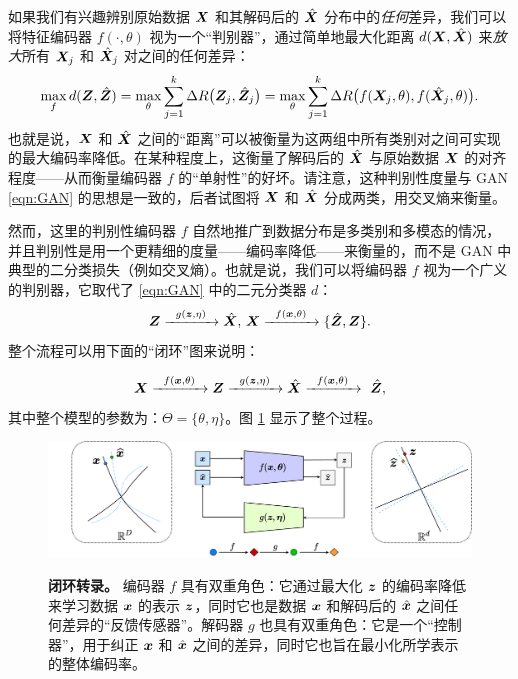 \documentclass[../../book-main.tex]{subfiles}
\begin{document}
{如果我们有兴趣辨别原始数据 $\bm{X}$ 和其解码后的 $\hat {\bm{X}}$ 分布中的{\em 任何}差异，我们可以将特征编码器 $f(\cdot, \theta)$ 视为一个“判别器”，通过简单地最大化距离 $d(\bm{X}, \hat {\bm{X}})$ 来{\em 放大}所有 $\bm{X}_j$ 和 $\hat {\bm{X}}_j$ 对之间的任何差异：
\begin{equation}
\max_f d(\bm{Z}, \hat {\bm{Z}}) = \max_{\theta} \sum_{j=1}^k \Delta R\big(\bm{Z}_j, \hat{\bm{Z}}_j\big) = \max_{\theta} \sum_{j=1}^k \Delta R\big(f(\bm{X}_j,\theta), f(\hat{\bm{X}}_j,\theta)\big).
    \label{eqn:max-distance}
\end{equation}
也就是说，$\bm{X}$ 和 $\hat {\bm{X}}$ 之间的“距离”可以被衡量为这两组中所有类别对之间可实现的最大编码率降低。在某种程度上，这衡量了解码后的 $\hat {\bm{X}}$ 与原始数据 $\bm{X}$ 的对齐程度——从而衡量编码器 $f$ 的“单射性”的好坏。请注意，这种判别性度量与 GAN \eqref{eqn:GAN} 的思想是一致的，后者试图将 $\bm{X}$ 和 $\hat {\bm{X}}$ 分成两类，用交叉熵来衡量。

然而，这里的判别性编码器 $f$ 自然地推广到数据分布是多类别和多模态的情况，并且判别性是用一个更精细的度量——编码率降低——来衡量的，而不是 GAN 中典型的二分类损失（例如交叉熵）。也就是说，我们可以将编码器 $f$ 视为一个广义的判别器，它取代了 \eqref{eqn:GAN} 中的二元分类器 $d$：
\begin{equation}
 \bm{Z} \xrightarrow{\hspace{2mm} g(\bm{z},\eta) \hspace{2mm}} \hat {\bm{X}}, \, \bm{X} \xrightarrow{\hspace{2mm} f(\bm{x}, \theta)\hspace{2mm}} \{\hat {\bm{Z}}, \bm{Z}\}.
 \label{eqn:closed-loop-GAN}
\end{equation}
整个流程可以用下面的“闭环”图来说明：}
\begin{equation}
    \bm{X} \xrightarrow{\hspace{2mm} f(\bm{x}, \theta)\hspace{2mm}} \bm{Z} \xrightarrow{\hspace{2mm} g(\bm{z},\eta) \hspace{2mm}} \hat {\bm{X}} \xrightarrow{\hspace{2mm} f(\bm{x}, \theta)\hspace{2mm}} \ \hat {\bm{Z}}, 
\end{equation}
其中整个模型的参数为：$\Theta = \{\theta, \eta\}$。图 \ref{fig:auto-encoding-closed} 显示了整个过程。

\begin{figure}[t]
{\includegraphics[width=1.0\linewidth]{figures/diagrams_redu_gan_2.pdf}}
\caption{{\bf 闭环转录。} 编码器 $f$ 具有双重角色：它通过最大化 $\bm{z}$ 的编码率降低来学习数据 $\bm{x}$ 的表示 $\bm{z}$，同时它也是数据 $\bm{x}$ 和解码后的 $\hat {\bm{x}}$ 之间任何差异的“反馈传感器”。解码器 $g$ 也具有双重角色：它是一个“控制器”，用于纠正 $\bm{x}$ 和 $\hat {\bm{x}}$ 之间的差异，同时它也旨在最小化所学表示的整体编码率。} \label{fig:auto-encoding-closed} 
\end{figure}
\end{document}
